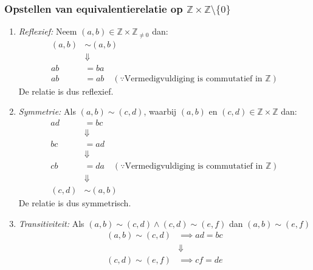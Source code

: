 \documentclass{article}
\newcommand{\Z}{\mathbb{Z}}
\newcommand{\tx}[1]{\text{#1}}
\newcommand{\en}{\text{ en }}
\begin{document}
\subsubsection*{Opstellen van equivalentierelatie op $\Z \times \Z 
\setminus \{0\}$}
\begin{enumerate}[label=\arabic*]
	\item \emph{Reflexief:} Neem $(a, b) \in \Z \times \Z_{\neq 0}$ dan:
	      \begin{align*}
		      (a, b) & \sim (a,b)                                                         \\
		             & \Downarrow                                                         \\
		      ab     & = ba                                                               \\
		      ab     & = ab \quad (\because \tx{Vermedigvuldiging is commutatief in } \Z)
	      \end{align*}
	      De relatie is dus reflexief.
	\item \emph{Symmetrie:} Als $(a, b) \sim (c,d)$, waarbij $(a, b) \en (c, d) \in \Z \times \Z$ dan:
	      \begin{align*}
		      ad     & = bc                                                               \\
		             & \Downarrow                                                         \\
		      bc     & = ad                                                               \\
		             & \Downarrow                                                         \\
		      cb     & = da \quad (\because \tx{Vermedigvuldiging is commutatief in } \Z) \\
		             & \Downarrow                                                         \\
		      (c,d ) & \sim (a,b)
	      \end{align*}
	      De relatie is dus symmetrisch.
	\item \emph{Transitiviteit:} Als $(a, b) \sim (c, d) \wedge (c, d) \sim (e, f)$ dan $(a, b) \sim (e, f)$
	      \begin{align*}
		      (a, b) \sim (c, d) & \implies ad = bc \\
		                         & \Downarrow       \\
		      (c, d) \sim (e, f) & \implies cf = de \\

\end{align*}
\end{enumerate}
\end{document}
